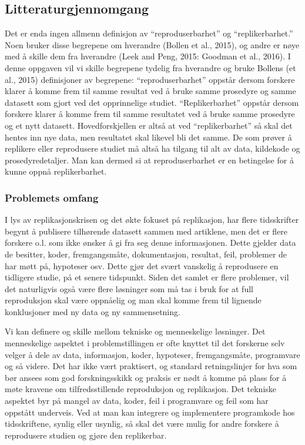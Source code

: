 \documentclass[
  12pt,
]{article}
\begin{document}
\hypertarget{litteraturgjennomgang}{%
\subsection{Litteraturgjennomgang}\label{litteraturgjennomgang}}

Det er enda ingen allmenn definisjon av ``reproduserbarhet'' og
``replikerbarhet.'' Noen bruker disse begrepene om hverandre (Bollen et
al., 2015), og andre er nøye med å skille dem fra hverandre (Leek and
Peng, 2015: Goodman et al., 2016). I denne oppgaven vil vi skille
begrepene tydelig fra hverandre og bruke Bollens (et al., 2015)
definisjoner av begrepene: ``reproduserbarhet'' oppstår dersom forskere
klarer å komme frem til samme resultat ved å bruke samme prosedyre og
samme datasett som gjort ved det opprinnelige studiet.
``Replikerbarhet'' oppstår dersom forskere klarer å komme frem til samme
resultatet ved å bruke samme prosedyre og et nytt datasett.
Hovedforskjellen er altså at ved ``replikerbarhet'' så skal det hentes
inn nye data, men resultatet skal likevel bli det samme. De som prøver å
replikere eller reprodusere studiet må altså ha tilgang til alt av data,
kildekode og prosedyredetaljer. Man kan dermed si at reproduserbarhet er
en betingelse for å kunne oppnå replikerbarhet.

\hypertarget{problemets-omfang}{%
\subsubsection{Problemets omfang}\label{problemets-omfang}}

I lys av replikasjonskrisen og det økte fokuset på replikasjon, har
flere tidsskrifter begynt å publisere tilhørende datasett sammen med
artiklene, men det er flere forskere o.l. som ikke ønsker å gi fra seg
denne informasjonen. Dette gjelder data de besitter, koder,
fremgangsmåte, dokumentasjon, resultat, feil, problemer de har møtt på,
hypoteser osv. Dette gjør det svært vanskelig å reprodusere en tidligere
studie, på et senere tidspunkt. Siden det samlet er flere problemer, vil
det naturligvis også være flere løsninger som må tas i bruk for at full
reproduksjon skal være oppnåelig og man skal komme frem til lignende
konklusjoner med ny data og ny sammensetning.

Vi kan definere og skille mellom tekniske og menneskelige løsninger. Det
menneskelige aspektet i problemstillingen er ofte knyttet til det
forskerne selv velger å dele av data, informasjon, koder, hypoteser,
fremgangsmåte, programvare og så videre. Det har ikke vært praktisert,
og standard retningslinjer for hva som bør ansees som god
forskningsskikk og praksis er nødt å komme på plass for å møte kravene
om tilfredsstillende reproduksjon og replikasjon. Det tekniske aspektet
byr på mangel av data, koder, feil i programvare og feil som har
oppstått underveis. Ved at man kan integrere og implementere programkode
hos tidsskriftene, synlig eller usynlig, så skal det være mulig for
andre forskere å reprodusere studien og gjøre den replikerbar.
\end{document}
